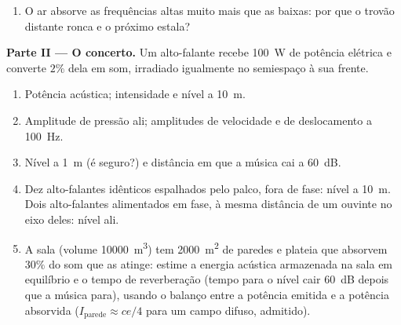 \begin{problem}
\begin{enumerate}
  \item O ar absorve as frequências altas muito mais que as baixas: por que
        o trovão distante ronca e o próximo estala?
\end{enumerate}

\medskip
\noindent\textbf{Parte II --- O concerto.}
Um alto-falante recebe \qty{100}{W} de potência elétrica e converte
$2\%$ dela em som, irradiado igualmente no semiespaço à sua
frente.
\begin{enumerate}[resume]
  \item Potência acústica; intensidade e nível a \qty{10}{m}.
  \item Amplitude de pressão ali; amplitudes de velocidade e de deslocamento
        a \qty{100}{Hz}.
  \item Nível a \qty{1}{m} (é seguro?) e distância em que a música
        cai a \qty{60}{dB}.
  \item Dez alto-falantes idênticos espalhados pelo palco, fora de
        fase: nível a \qty{10}{m}. Dois alto-falantes alimentados em fase, à
        mesma distância de um ouvinte no eixo deles: nível ali.
  \item A sala (volume \qty{10000}{m^3}) tem \qty{2000}{m^2} de paredes e plateia que absorvem $30\%$ do
        som que as atinge: estime a energia acústica armazenada na
        sala em equilíbrio e o tempo de reverberação (tempo para o
        nível cair \qty{60}{dB} depois que a música para), usando o
        balanço entre a potência emitida e a potência absorvida
        ($I_{\text{parede}} \approx ce/4$ para um campo difuso, admitido).
\end{enumerate}


\end{problem}
